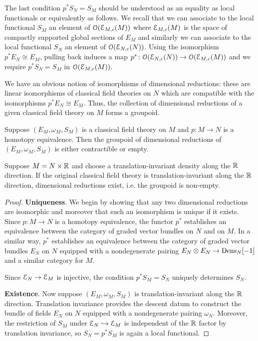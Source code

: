 \documentclass[10pt, oneside]{article}
\begin{document}
\begin{remark}
The last condition $p^* S_N = S_M$ should be understood as an equality as local functionals or equivalently as follows. 
We recall that we can associate to the local functional $S_M$ an element of $\mathcal O(\mathcal E_{M,c}(M))$ where $\mathcal E_{M,c}(M)$ is the space of compactly supported global sections of $E_M$ and similarly we can associate to the local functional $S_N$ an element of $\mathcal O(\mathcal E_{N,c}(N))$. 
Using the isomorphism $p^* E_N \cong E_M$, pulling back induces a map $p^* \colon \mathcal O(\mathcal E_{N,c}(N)) \to \mathcal O(\mathcal E_{M,c}(M))$ and we require $p^*S_N = S_M$ in $\mathcal O(\mathcal E_{M,c}(M))$.
\end{remark}

We have an obvious notion of isomorphisms of dimensional reductions: these are linear isomorphisms of classical field theories on $N$ which are compatible with the isomorphisms $p^* E_N\cong E_M$. Thus, the collection of dimensional reductions of a given classical field theory on $M$ forms a groupoid.

\begin{prop}
Suppose $(E_M, \omega_M, S_M)$ is a classical field theory on $M$ and $p\colon M\rightarrow N$ is a homotopy equivalence. Then the groupoid of dimensional reductions of $(E_M, \omega_M, S_M)$ is either contractible or empty.

Suppose $M=N\times \mathbb R$ and choose a translation-invariant density along the $\mathbb R$ direction. If the original classical field theory is translation-invariant along the $\mathbb R$ direction, dimensional reductions exist, i.e. the groupoid is non-empty.
\label{prop:dimensionalreductionunique}
\end{prop}
\begin{proof} \textbf{Uniqueness}. We begin by showing that any two dimensional reductions are isomorphic and moreover that such an isomorphism is unique if it exists. Since $p\colon M\rightarrow N$ is a homotopy equivalence, the functor $p^*$ establishes an equivalence between the category of graded vector bundles on $N$ and on $M$. In a similar way, $p^*$ establishes an equivalence between the category of graded vector bundles $E_N$ on $N$ equipped with a nondegenerate pairing $E_N\otimes E_N\rightarrow \mathrm{Dens}_N[-1]$ and a similar category for $M$.

Since $\mathcal E_N\rightarrow \mathcal E_M$ is injective, the condition $p^* S_M = S_N$ uniquely determines $S_N$.

\textbf{Existence}. Now suppose $(E_M, \omega_M, S_M)$ is translation-invariant along the $\mathbb R$ direction. Translation invariance provides the descent datum to construct the bundle of fields $E_N$ on $N$ equipped with a nondegenerate pairing $\omega_N$. Moreover, the restriction of $S_M$ under $\mathcal E_N\hookrightarrow \mathcal E_M$ is independent of the $\mathbb R$ factor by translation invariance, so $S_N=p^* S_M$ is again a local functional.
\end{proof}
\end{document}
